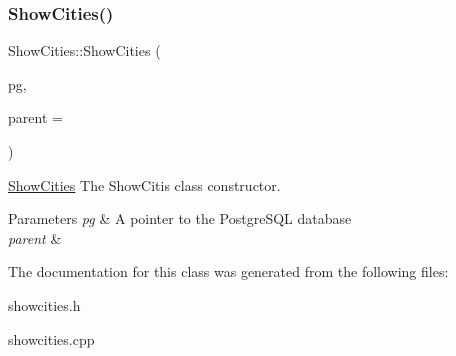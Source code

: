 \subsubsection{\texorpdfstring{Show\+Cities()}{ShowCities()}}
{\footnotesize\ttfamily Show\+Cities\+::\+Show\+Cities (\begin{DoxyParamCaption}\item[{\hyperlink{classpsql}{psql} $\ast$}]{pg,  }\item[{Q\+Widget $\ast$}]{parent = {} }\end{DoxyParamCaption})\hspace{0.3cm}{\ttfamily [explicit]}}



\hyperlink{class_show_cities}{Show\+Cities} The Show\+Citis class constructor. 


\begin{DoxyParams}{Parameters}
{\em pg} & A pointer to the Postgre\+S\+QL database \\
\hline
{\em parent} & \\
\hline
\end{DoxyParams}


The documentation for this class was generated from the following files\+:\begin{DoxyCompactItemize}
\item 
showcities.\+h\item 
showcities.\+cpp\end{DoxyCompactItemize}
